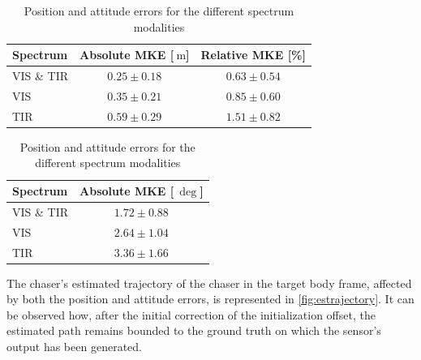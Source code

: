 \begin{table}[!h]
    \begin{subtable}[h]{1\textwidth}
        \centering
        \begin{tabular}{l  c c}
        Spectrum & Absolute MKE [$\SI{}{\meter}$]& Relative MKE [\%]\\ \hline \hline
        VIS \& TIR &$0.25\pm 0.18$ & $0.63\pm 0.54$\\\hline
        VIS & $0.35\pm 0.21$ & $0.85\pm 0.60$\\\hline
        TIR & $0.59\pm 0.29$ & $1.51\pm 0.82$\\\hline
        
       \end{tabular}
       \caption{Position errors}
       \label{tab:poserrs}
    \end{subtable}
    \hfill
    \begin{subtable}[h]{1\textwidth}
        \centering
        \begin{tabular}{l  c }
        Spectrum & Absolute MKE [$\SI{}{\deg}$]\\ \hline \hline
        VIS \& TIR &  $1.72\pm 0.88$\\\hline
        VIS &  $2.64\pm 1.04$ \\\hline
        TIR &  $3.36\pm 1.66$ \\\hline
        \end{tabular}
        \caption{Attitude errors}
        \label{tab:atterrs}
     \end{subtable}
     \caption{Position and attitude errors for the different spectrum modalities}
     \label{tab:posatters}
\end{table}
The chaser's estimated trajectory of the chaser in the target body frame, affected by both the position and attitude errors, is represented in \cref{fig:estrajectory}. It can be observed how, after the initial correction of the initialization offset, the estimated path remains bounded to the ground truth on which the sensor's output has been generated. \\

